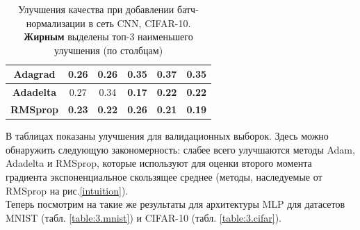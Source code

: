 \documentclass[12pt]{article}
\begin{document}
\begin{table}[h!]
\begin{minipage}{0.45\linewidth}
\begin{tabular}{|c|c|c|c|c|c|}
Adagrad & \textbf{0.26} & \textbf{0.26} & 0.35 & 0.37 & 0.35 \\\hline

\textbf{Adadelta} & 0.27 & 0.34 & \textbf{0.17} & \textbf{0.22} & \textbf{0.22} \\\hline

\textbf{RMSprop} & \textbf{0.23} & \textbf{0.22} & \textbf{0.26} & \textbf{0.21} & \textbf{0.19} \\\hline

\end{tabular}
\caption{\small Улучшения качества при добавлении батч-нормализации в сеть CNN, CIFAR-10. \textbf{Жирным} выделены топ-3 наименьшего улучшения (по столбцам)} \label{table:2.cifar}
\end{minipage} 
\end{table}


В таблицах показаны улучшения для валидационных выборок. Здесь можно обнаружить следующую закономерность: слабее всего улучшаются методы Adam, Adadelta и RMSprop, которые используют для оценки второго момента градиента экспоненциальное скользящее среднее (методы, наследуемые от RMSprop на рис.\ref{intuition}).\\


Теперь посмотрим на такие же результаты для архитектуры MLP для датасетов MNIST (табл. \ref{table:3.mnist}) и CIFAR-10 (табл. \ref{table:3.cifar}).
\end{document}

